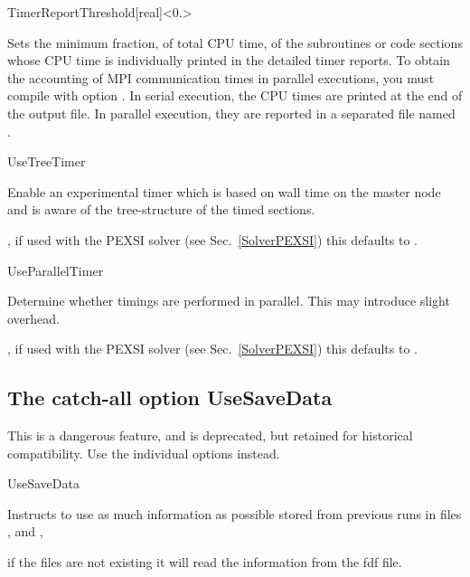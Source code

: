 \begin{fdfentry}{TimerReportThreshold}[real]<$0.$>

  Sets the minimum fraction, of total CPU time, of the subroutines or
  code sections whose CPU time is individually printed in the detailed
  timer reports. To obtain the accounting of MPI communication times
  in parallel executions, you must compile with option
  .
  In serial execution, the CPU times are printed at the end of the
  output file. In parallel execution, they are reported in a separated
  file named .
  
\end{fdfentry}

\begin{fdflogicalF}{UseTreeTimer}

  Enable an experimental timer which is based on wall time on the
  master node and is aware of the tree-structure of the timed
  sections.

  \note, if used with the PEXSI solver (see Sec.~\ref{SolverPEXSI})
  this defaults to \fdftrue.
  
\end{fdflogicalF}

\begin{fdflogicalT}{UseParallelTimer}

  Determine whether timings are performed in parallel. This may
  introduce slight overhead.

  \note, if used with the PEXSI solver (see Sec.~\ref{SolverPEXSI})
  this defaults to \fdffalse.
  
\end{fdflogicalT}



\subsection{The catch-all option UseSaveData}

This is a dangerous feature, and is deprecated, but retained for
historical compatibility. Use the individual options instead.


\begin{fdflogicalF}{UseSaveData}

  Instructs to use as much information as possible stored from
  previous runs in files ,  and ,

  \note if the files are not existing it will read the information
  from the fdf file.

\end{fdflogicalF}



